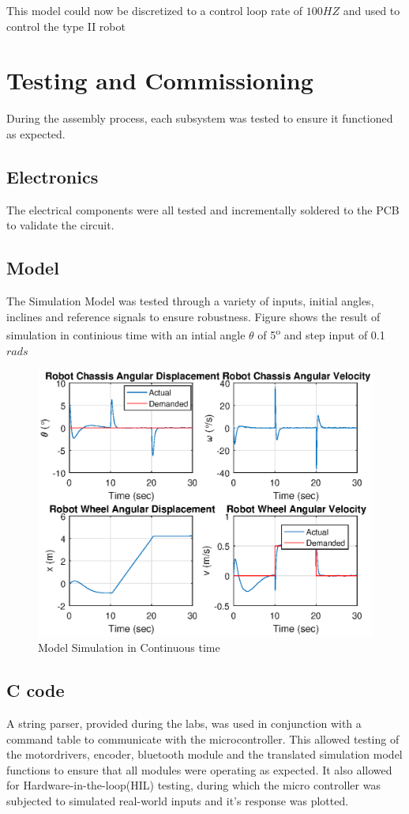 \documentclass{UoNMCHA}
\numberwithin{equation}{section}
\begin{document}
This model could now be discretized to a control loop rate of $100HZ$ and used to control the type II robot

\newpage
\section{Testing and Commissioning}\label{Testing}
During the assembly process, each subsystem was tested to ensure it functioned as expected.\\ 

\subsection{Electronics} The electrical components were all tested and incrementally soldered to the PCB to validate the circuit. 
\subsection{Model}
The Simulation Model was tested through a variety of inputs, initial angles, inclines and reference signals to ensure robustness. Figure shows the result of simulation in continious time with an intial angle $\theta$ of 5\textsuperscript{o} and step input of 0.1 $rads$

\begin{figure}[!h]
	\begin{center}
		\includegraphics[width=.6\linewidth]{figs/cont1}
		\caption{Model Simulation in Continuous time}
		\label{cont1}
	\end{center}
\end{figure}


\subsection{C code} A string parser, provided during the labs, was used in conjunction with a command table to communicate with the microcontroller. This allowed testing of the motordrivers, encoder, bluetooth module and the translated simulation model functions to ensure that all modules were operating as expected. It also allowed for Hardware-in-the-loop(HIL) testing, during which the micro controller was subjected to simulated real-world inputs and it's response was plotted.
\end{document}
